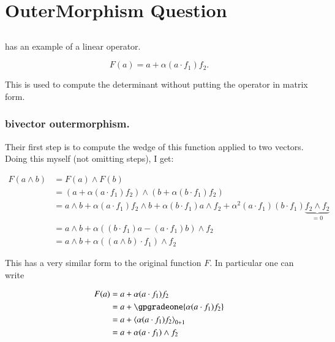 \chapter{OuterMorphism Question }
\label{chap:outermorphismDet}
\date{Sept. 2, 2008.  outermorphismDet.tex}

\section{ }

\cite{doran2003gap}
has an example of a linear operator.

\begin{equation}\label{eqn:outermorphism_det:F}
F(a) = a + \alpha(a \cdot f_1) f_2. 
\end{equation} 

This is used to compute the determinant without putting the operator 
in matrix form.

\subsection{bivector outermorphism. }

Their first step is to compute the wedge of this function applied to two vectors.  Doing this myself (not omitting steps), I get:

\begin{align*} 
F(a \wedge b) 
&= F(a) \wedge F(b) \\
&= (a + \alpha(a \cdot f_1) f_2 ) \wedge (b + \alpha(b \cdot f_1) f_2 ) \\
&= a \wedge b + \alpha(a \cdot f_1) f_2 \wedge b
+ \alpha (b \cdot f_1) a \wedge f_2 
+ \alpha^2 (a \cdot f_1) (b \cdot f_1) \underbrace{f_2 \wedge f_2}_{=0} \\
&= a \wedge b 
+ \alpha \left( (b \cdot f_1) a - (a \cdot f_1) b \right) \wedge f_2  
\\
&= a \wedge b 
+ \alpha \left( (a \wedge b ) \cdot f_1 \right) \wedge f_2  
\end{align*} 

This has a very similar form to the original function $F$.  In particular 
one can write 

\begin{align*}
F(a) 
&= a + \alpha(a \cdot f_1) f_2 \\
&= a + \gpgradeone{\alpha(a \cdot f_1) f_2} \\
&= a + \gpgrade{\alpha(a \cdot f_1) f_2}{0+1} \\
&= a + \alpha(a \cdot f_1) \wedge f_2 \\
\end{align*}

